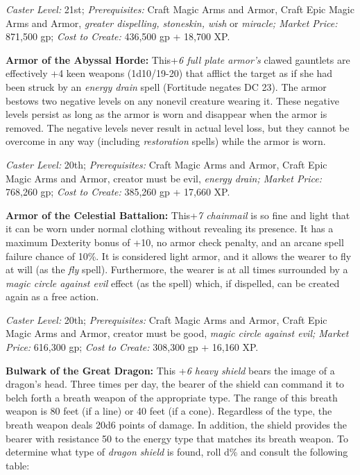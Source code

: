 \documentclass{article}
\begin{document}
\textit{Caster Level: }21st; \textit{Prerequisites: }Craft Magic Arms and Armor, 
Craft Epic Magic Arms and Armor, \textit{greater dispelling, stoneskin, wish }or 
\textit{miracle; Market Price: }871,500 gp; \textit{Cost to Create: }436,500 gp 
+ 18,700 XP. 

\textbf{Armor of the Abyssal Horde: }This+\textit{6 full plate armor's} clawed 
gauntlets are effectively +4 keen weapons (1d10/19-20) that afflict the target 
as if she had been struck by an \textit{energy drain }spell (Fortitude negates 
DC 23). The armor bestows two negative levels on any nonevil creature wearing it. 
These negative levels persist as long as the armor is worn and disappear when the 
armor is removed. The negative levels never result in actual level loss, but they 
cannot be overcome in any way (including \textit{restoration }spells) while the 
armor is worn. 

\textit{Caster Level: }20th; \textit{Prerequisites: }Craft Magic Arms and Armor, 
Craft Epic Magic Arms and Armor, creator must be evil, \textit{energy drain; Market 
Price: }768,260 gp; \textit{Cost to Create: }385,260 gp + 17,660 XP. 

\textbf{Armor of the Celestial Battalion: }This+\textit{7 chainmail }is so fine 
and light that it can be worn under normal clothing without revealing its presence. 
It has a maximum Dexterity bonus of +10, no armor check penalty, and an arcane 
spell failure chance of 10\%. It is considered light armor, and it allows the wearer 
to fly at will (as the \textit{fly }spell). Furthermore, the wearer is at all times 
surrounded by a \textit{magic circle against evil }effect (as the spell) which, 
if dispelled, can be created again as a free action. 

\textit{Caster Level: }20th; \textit{Prerequisites: }Craft Magic Arms and Armor, 
Craft Epic Magic Arms and Armor, creator must be good, \textit{magic circle against 
evil; Market Price: }616,300 gp; \textit{Cost to Create: }308,300 gp + 16,160 XP. 

\textbf{Bulwark of the Great Dragon: }This +\textit{6 heavy shield} bears the image 
of a dragon's head. Three times per day, the bearer of the shield can command it 
to belch forth a breath weapon of the appropriate type. The range of this breath 
weapon is 80 feet (if a line) or 40 feet (if a cone). Regardless of the type, the 
breath weapon deals 20d6 points of damage. In addition, the shield provides the 
bearer with resistance 50 to the energy type that matches its breath weapon. To 
determine what type of \textit{dragon shield }is found, roll d\% and consult the 
following table:
\end{document}
